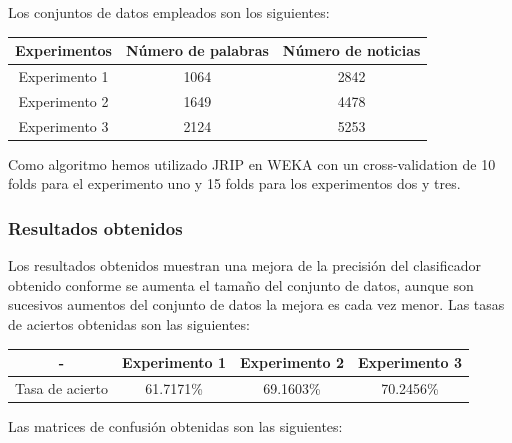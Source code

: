 Los conjuntos de datos empleados son los siguientes:
\vspace{1em}
\begin{center}


\begin{tabular}{|c|c|c|}
\hline 
Experimentos & Número de palabras & Número de noticias \\ 
\hline 
Experimento 1 & 1064 & 2842 \\ 
\hline 
Experimento 2 & 1649 & 4478 \\ 
\hline 
Experimento 3 & 2124 & 5253 \\ 
\hline 
\end{tabular} 
\end{center}
\vspace{1em}
Como algoritmo hemos utilizado JRIP en WEKA con un cross-validation de 10 folds para el experimento uno y 15 folds para los experimentos dos y tres.
\subsubsection{Resultados obtenidos}

Los resultados obtenidos muestran una mejora de la precisión del clasificador obtenido conforme se aumenta el tamaño del conjunto de datos, aunque son sucesivos aumentos del conjunto de datos la mejora es cada vez menor. Las tasas de aciertos obtenidas son las siguientes:
\vspace{1em}
\begin{center}


\begin{tabular}{|c|c|c|c|}
\hline 
- & Experimento 1 & Experimento 2 & Experimento 3 \\ 
\hline 
Tasa de acierto & 61.7171\% & 69.1603\% & 70.2456\% \\ 
\hline 
\end{tabular} 
\end{center}
\vspace{1em}
Las matrices de confusión obtenidas son las siguientes:

